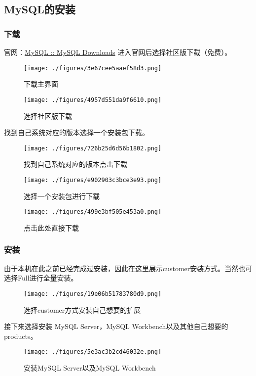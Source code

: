 \subsection{MySQL的安装}

\subsubsection{下载}
官网：\href{https://www.mysql.com/downloads/}{MySQL :: MySQL Downloads}
进入官网后选择社区版下载（免费）。
\begin{figure}[ht]
\centering
\texttt{[image: ./figures/3e67cee5aaef58d3.png]}
\caption{下载主界面} \label{fig_MSQ001_3}
\end{figure}

\begin{figure}[ht]
\centering
\texttt{[image: ./figures/4957d551da9f6610.png]}
\caption{选择社区版下载} \label{fig_MSQ001_4}
\end{figure}
找到自己系统对应的版本选择一个安装包下载。
\begin{figure}[ht]
\centering
\texttt{[image: ./figures/726b25d6d56b1802.png]}
\caption{找到自己系统对应的版本点击下载} \label{fig_MSQ001_5}
\end{figure}

\begin{figure}[ht]
\centering
\texttt{[image: ./figures/e902903c3bce3e93.png]}
\caption{选择一个安装包进行下载} \label{fig_MSQ001_6}
\end{figure}

\begin{figure}[ht]
\centering
\texttt{[image: ./figures/499e3bf505e453a0.png]}
\caption{点击此处直接下载} \label{fig_MSQ001_7}
\end{figure}

\subsubsection{安装}
由于本机在此之前已经完成过安装，因此在这里展示customer安装方式。当然也可选择Full进行全量安装。
\begin{figure}[ht]
\centering
\texttt{[image: ./figures/19e06b51783780d9.png]}
\caption{选择customer方式安装自己想要的扩展} \label{fig_MSQ001_8}
\end{figure}

接下来选择安装 MySQL Server，MySQL Workbench以及其他自己想要的products。
\begin{figure}[ht]
\centering
\texttt{[image: ./figures/5e3ac3b2cd46032e.png]}
\caption{安装MySQL Server以及MySQL Workbench} \label{fig_MSQ001_9}
\end{figure}


